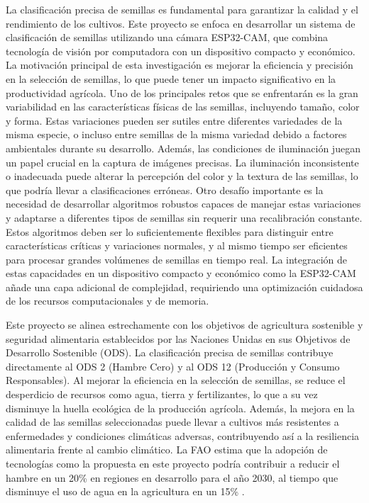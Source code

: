 La clasificación precisa de semillas es fundamental para garantizar la calidad y el rendimiento de los cultivos. Este proyecto se enfoca en desarrollar un sistema de clasificación de semillas utilizando una cámara ESP32-CAM, que combina tecnología de visión por computadora con un dispositivo compacto y económico. La motivación principal de esta investigación es mejorar la eficiencia y precisión en la selección de semillas, lo que puede tener un impacto significativo en la productividad agrícola. Uno de los principales retos que se enfrentarán es la gran variabilidad en las características físicas de las semillas, incluyendo tamaño, color y forma. Estas variaciones pueden ser sutiles entre diferentes variedades de la misma especie, o incluso entre semillas de la misma variedad debido a factores ambientales durante su desarrollo. Además, las condiciones de iluminación juegan un papel crucial en la captura de imágenes precisas. La iluminación inconsistente o inadecuada puede alterar la percepción del color y la textura de las semillas, lo que podría llevar a clasificaciones erróneas. Otro desafío importante es la necesidad de desarrollar algoritmos robustos capaces de manejar estas variaciones y adaptarse a diferentes tipos de semillas sin requerir una recalibración constante. Estos algoritmos deben ser lo suficientemente flexibles para distinguir entre características críticas y variaciones normales, y al mismo tiempo ser eficientes para procesar grandes volúmenes de semillas en tiempo real. La integración de estas capacidades en un dispositivo compacto y económico como la ESP32-CAM añade una capa adicional de complejidad, requiriendo una optimización cuidadosa de los recursos computacionales y de memoria.

Este proyecto se alinea estrechamente con los objetivos de agricultura sostenible y seguridad alimentaria establecidos por las Naciones Unidas en sus Objetivos de Desarrollo Sostenible (ODS). La clasificación precisa de semillas contribuye directamente al ODS 2 (Hambre Cero) y al ODS 12 (Producción y Consumo Responsables). Al mejorar la eficiencia en la selección de semillas, se reduce el desperdicio de recursos como agua, tierra y fertilizantes, lo que a su vez disminuye la huella ecológica de la producción agrícola. Además, la mejora en la calidad de las semillas seleccionadas puede llevar a cultivos más resistentes a enfermedades y condiciones climáticas adversas, contribuyendo así a la resiliencia alimentaria frente al cambio climático. La FAO estima que la adopción de tecnologías como la propuesta en este proyecto podría contribuir a reducir el hambre en un 20\% en regiones en desarrollo para el año 2030, al tiempo que disminuye el uso de agua en la agricultura en un 15\% \cite{trendov2019tecnologias}.

